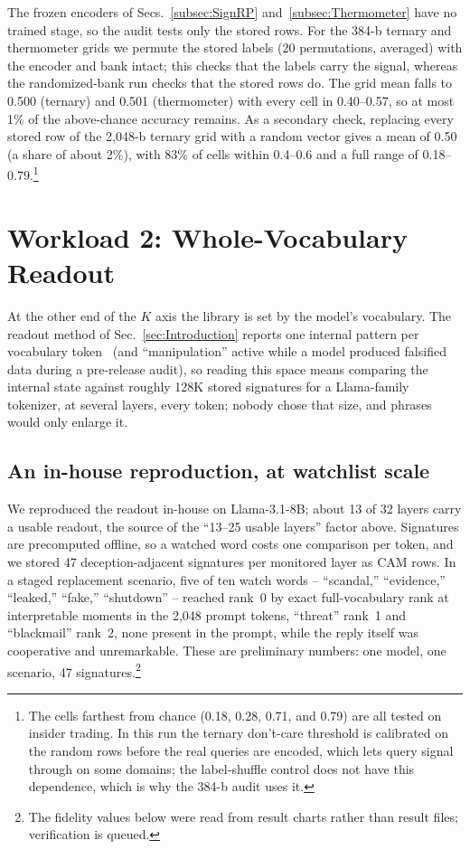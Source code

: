 \documentclass[conference]{IEEEtran}
\newcommand{\cam}{{CAM}\xspace}
\begin{document}
The frozen encoders of Secs.~\ref{subsec:SignRP}
and~\ref{subsec:Thermometer} have no trained stage, so the audit
tests only the stored rows. For the 384-b ternary and thermometer
grids we permute the stored labels (20 permutations, averaged) with
the encoder and bank intact; this checks that the labels carry the
signal, whereas the randomized-bank run checks that the stored rows
do. The grid mean falls to 0.500 (ternary) and 0.501 (thermometer)
with every cell in 0.40--0.57, so at most 1\% of the above-chance
accuracy remains. As a secondary check, replacing every stored row
of the 2{,}048-b ternary grid with a random vector gives a mean of
0.50 (a share of about 2\%), with 83\% of cells within 0.4--0.6 and a
full range of 0.18--0.79.\footnote{The cells farthest from chance
(0.18, 0.28, 0.71, and 0.79) are all tested on insider trading. In
this run the ternary don't-care threshold is calibrated on the random
rows before the real queries are encoded, which lets query signal
through on some domains; the label-shuffle control does not have this
dependence, which is why the 384-b audit uses it.}

\section{Workload 2: Whole-Vocabulary Readout}
\label{sec:LargeK}
\label{subsec:Jspace}
At the other end of the $K$ axis the library is set by the model's
vocabulary. The readout method of Sec.~\ref{sec:Introduction}
reports one internal pattern per vocabulary
token~\cite{anthropic2026workspace} (and ``manipulation'' active
while a model produced falsified data during a pre-release audit), so
reading this space means comparing the internal state against
roughly 128K stored signatures for a Llama-family tokenizer, at
several layers, every token; nobody chose that size, and phrases
would only enlarge it.

\subsection{An in-house reproduction, at watchlist scale}
\label{subsec:Watchlist}
We reproduced the readout in-house on Llama-3.1-8B; about 13 of 32
layers carry a usable readout, the source of the ``13--25 usable
layers'' factor above. Signatures are
precomputed offline, so a watched word costs one comparison per
token, and we stored 47 deception-adjacent signatures per monitored
layer as \cam rows. In a staged replacement scenario, five of ten
watch words -- ``scandal,'' ``evidence,''
``leaked,'' ``fake,'' ``shutdown'' -- reached rank~0 by exact
full-vocabulary rank at interpretable moments in the 2{,}048 prompt
tokens, ``threat'' rank~1 and ``blackmail'' rank~2, none present in
the prompt, while the reply itself was cooperative and unremarkable. These are preliminary numbers: one
model, one scenario, 47 signatures.\footnote{The fidelity values below were read from result
charts rather than result files; verification is queued.}
\end{document}
